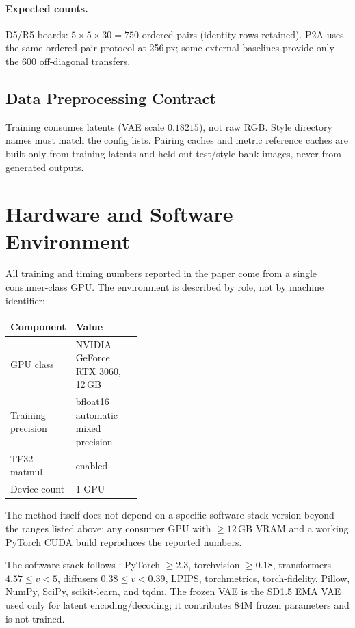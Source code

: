 \documentclass[letterpaper]{article}
\begin{document}
\paragraph{Expected counts.}
D5/R5 boards: $5{\times}5{\times}30{=}750$ ordered pairs (identity rows retained).
P2A uses the same ordered-pair protocol at 256\,px; some external baselines provide only
the 600 off-diagonal transfers.

\subsection{Data Preprocessing Contract}

Training consumes latents (VAE scale $0.18215$), not raw RGB. Style directory names must
match the config lists. Pairing caches and metric reference caches are built only from
training latents and held-out test/style-bank images, never from generated outputs.

\section{Hardware and Software Environment}

All training and timing numbers reported in the paper come from a single consumer-class
GPU. The environment is described by role, not by machine identifier:

\begin{center}
\begin{tabularx}{\linewidth}{p{0.38\linewidth}X}
\toprule
Component & Value \\
\midrule
GPU class & NVIDIA GeForce RTX 3060, 12\,GB \\
Training precision & bfloat16 automatic mixed precision \\
TF32 matmul & enabled \\
Device count & 1 GPU \\
\bottomrule
\end{tabularx}
\end{center}

The method itself does not depend on a specific software stack version beyond the ranges listed above; any
consumer GPU with $\geq 12$\,GB VRAM and a working PyTorch CUDA build reproduces the
reported numbers.

The software stack follows : PyTorch
\(\ge 2.3\), torchvision \(\ge 0.18\), transformers \(4.57 \le v < 5\), diffusers
\(0.38 \le v < 0.39\), LPIPS, torchmetrics, torch-fidelity, Pillow, NumPy, SciPy,
scikit-learn, and tqdm. The frozen VAE is the SD1.5 EMA VAE used only for latent
encoding/decoding; it contributes 84M frozen parameters and is not trained.
\end{document}
